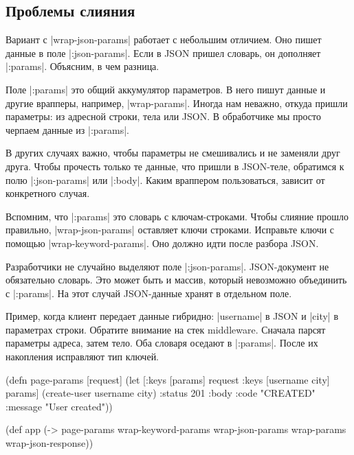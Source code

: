 \subsection{Проблемы слияния}

Вариант с \spverb|wrap-json-params| работает с небольшим отличием. Оно пишет
данные в поле \spverb|:json-params|. Если в JSON пришел словарь, он дополняет
\spverb|:params|. Объясним, в чем разница.

Поле \spverb|:params| это общий аккумулятор параметров. В него пишут данные и
другие врапперы, например, \spverb|wrap-params|. Иногда нам неважно, откуда
пришли параметры: из адресной строки, тела или JSON. В обработчике мы просто
черпаем данные из \spverb|:params|.

В других случаях важно, чтобы параметры не смешивались и не заменяли друг
друга. Чтобы прочесть только те данные, что пришли в JSON-теле, обратимся к полю
\spverb|:json-params| или \spverb|:body|. Каким враппером пользоваться, зависит
от конкретного случая.

Вспомним, что \spverb|:params| это словарь с ключам-строками. Чтобы слияние
прошло правильно, \spverb|wrap-json-params| оставляет ключи строками. Исправьте
ключи с помощью \spverb|wrap-keyword-params|. Оно должно идти после разбора
JSON.

Разработчики не случайно выделяют поле \spverb|:json-params|. JSON-документ не
обязательно словарь. Это может быть и массив, который невозможно объединить с
\spverb|:params|. На этот случай JSON-данные хранят в отдельном поле.

Пример, когда клиент передает данные гибридно: \spverb|username| в JSON и
\spverb|city| в параметрах строки. Обратите внимание на стек middleware. Сначала
парсят параметры адреса, затем тело. Оба словаря оседают в
\spverb|:params|. После их накопления исправляют тип ключей.

\begin{english}
  \begin{clojure}
(defn page-params [request]
  (let [{:keys [params]} request
        {:keys [username city]} params]
    (create-user username city)
    {:status 201
     :body {:code "CREATED"
            :message "User created"}}))

(def app (-> page-params
             wrap-keyword-params
             wrap-json-params
             wrap-params
             wrap-json-response))
  \end{clojure}
\end{english}

